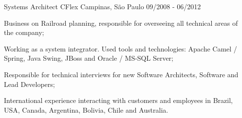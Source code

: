 \begin{cventries}
\cventry
{Systems Architect}
{CFlex}
{Campinas, São Paulo}
{09/2008 - 06/2012}
{
\begin{cvitems}
\item Business on Railroad planning, responsible for overseeing all technical areas of the company;
\item Working as a system integrator. Used tools and technologies: Apache Camel / Spring, Java Swing, JBoss and Oracle / MS-SQL Server;
\item Responsible for technical interviews for new Software Architects, Software and Lead Developers;
\item International experience interacting with customers and employees in Brazil, USA, Canada, Argentina, Bolivia, Chile and Australia.
\end{cvitems}
}
\end{cventries}


